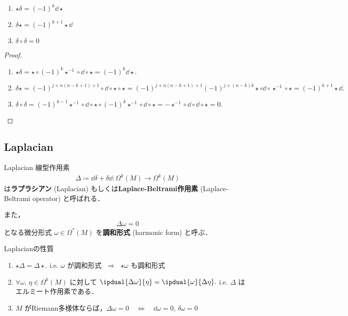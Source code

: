 \documentclass[geometry_main]{subfiles}
\begin{document}
\begin{myprop}[label=prop.adj_extdiff2]{}
	\begin{enumerate} 
		\item $\star \delta = (-1)^k \dd{} \star$
		\item $\delta \star = (-1)^{k+1} \star \dd{}$
		\item $\delta \circ \delta = 0$
	\end{enumerate}
\end{myprop}

\begin{proof} 
	\begin{enumerate} 
		\item $\star \delta = \star \circ (-1)^k \star^{-1} \circ \dd{} \circ \star = (-1)^k \dd{} \star.$
		\item $\delta \star = (-1)^{j+n(n-k+1)+1} \circ \dd{} \circ \star \circ \star = (-1)^{j+n(n-k+1)+1}(-1)^{j+(n-k)k} \star \circ \dd{} \circ \star^{-1} \circ \star = (-1)^{k+1} \star \dd{}.$
		\item $\delta \circ \delta = (-1)^{k-1} \star^{-1} \circ \dd{} \circ \star \circ (-1)^k \star^{-1} \circ \dd{} \circ \star = - \star^{-1} \circ \dd{} \circ \dd{} \circ \star = 0.$
	\end{enumerate}
\end{proof}


\subsection{Laplacian}

\begin{mydef}[label=def.Laplacian]{Laplacian} 
	線型作用素
	\begin{align} 
		\Delta \coloneqq \dd{\delta} + \delta \dd{} \colon \Omega^k(M) \to \Omega^k(M)
	\end{align}
	は\textbf{ラプラシアン} (Laplacian) もしくは\textbf{Laplace-Beltrami作用素} (Laplace-Beltrami operator) と呼ばれる．
	
	また，
	\begin{align} 
		\Delta \omega = 0
	\end{align}
	となる微分形式 $\omega \in \Omega^*(M)$ を\textbf{調和形式} (harmonic form) と呼ぶ．
\end{mydef}

\begin{myprop}[label=prop.Laplacian]{Laplacianの性質}
	\begin{enumerate} 
		\item $\star \Delta = \Delta \star.$ i.e. $\omega$ が調和形式 $\; \Longrightarrow \;$ $\star \omega$ も調和形式
		\item $\forall \omega,\, \eta \in \Omega^k(M)$ に対して $\ipdual{\Delta \omega}{\eta} = \ipdual{\omega}{\Delta \eta}.$ i.e. $\Delta$ はエルミート作用素である．
		\item $M$ がRiemann多様体ならば，$\Delta \omega = 0\quad \Longleftrightarrow \quad \dd{\omega} = 0,\, \delta \omega = 0$ 
	\end{enumerate}
\end{myprop}
\end{document}
